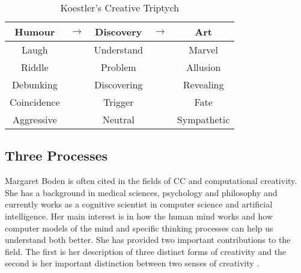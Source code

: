 
\begin{table}[!htbp]
\caption[Koestler's Creative Triptych]{Koestler's Creative Triptych}
\label{tab:KHDA}
  \centering
  \begin{tabu}{ccccc}
  \toprule
  \textbf{Humour} & $\to$ & \textbf{Discovery} & $\to$ & \textbf{Art} \\
  \midrule
  Laugh           && Understand         && Marvel       \\
  Riddle          && Problem            && Allusion     \\
  Debunking       && Discovering        && Revealing    \\
  Coincidence     && Trigger            && Fate         \\
  Aggressive      && Neutral            && Sympathetic  \\
  \bottomrule
  \end{tabu}
\end{table}


\subsection{Three Processes}
\label{s:boden}

Margaret Boden is often cited in the fields of \ac{CC} and computational creativity. She has a background in medical sciences, psychology and philosophy and currently works as a cognitive scientist in computer science and artificial intelligence. Her main interest is in how the human mind works and how computer models of the mind and specific thinking processes can help us understand both better. She has provided two important contributions to the field. The first is her description of three distinct forms of creativity and the second is her important distinction between two senses of creativity \autocite{Boden2003}.

